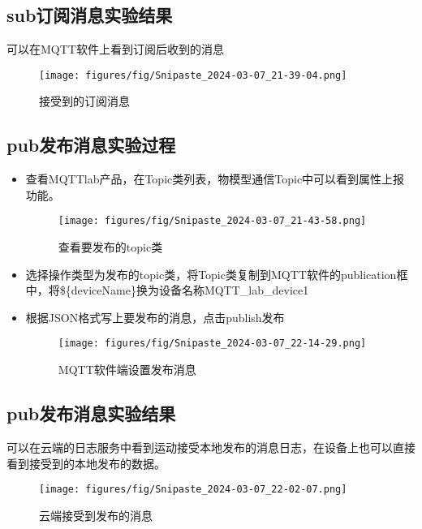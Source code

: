\documentclass[12pt,hyperref,a4paper,UTF8]{ctexart}
\begin{document}
\subsection{sub订阅消息实验结果}
可以在MQTT软件上看到订阅后收到的消息

\begin{figure}[H]
    \centering
    \texttt{[image: figures/fig/Snipaste\_2024-03-07\_21-39-04.png]}
    \caption{接受到的订阅消息}
    \label{fig:enter-label}
\end{figure}


\subsection{pub发布消息实验过程}

\begin{itemize}
    \item 查看MQTTlab产品，在Topic类列表，物模型通信Topic中可以看到属性上报功能。
    \begin{figure}[H]
        \centering
        \texttt{[image: figures/fig/Snipaste\_2024-03-07\_21-43-58.png]}
        \caption{查看要发布的topic类}
        \label{fig:enter-label}
    \end{figure}

    \item 选择操作类型为发布的topic类，将Topic类复制到MQTT软件的publication框中，将\$\{deviceName\}换为设备名称MQTT\_lab\_device1
    \item 根据JSON格式写上要发布的消息，点击publish发布
    \begin{figure}[H]
        \centering
        \texttt{[image: figures/fig/Snipaste\_2024-03-07\_22-14-29.png]}
        \caption{MQTT软件端设置发布消息}
        \label{fig:enter-label}
    \end{figure}

\end{itemize}

\subsection{pub发布消息实验结果}
可以在云端的日志服务中看到运动接受本地发布的消息日志，在设备上也可以直接看到接受到的本地发布的数据。
\begin{figure}[H]
    \centering
    \texttt{[image: figures/fig/Snipaste\_2024-03-07\_22-02-07.png]}
    \caption{云端接受到发布的消息}
    \label{fig:enter-label}
\end{figure}
\end{document}
